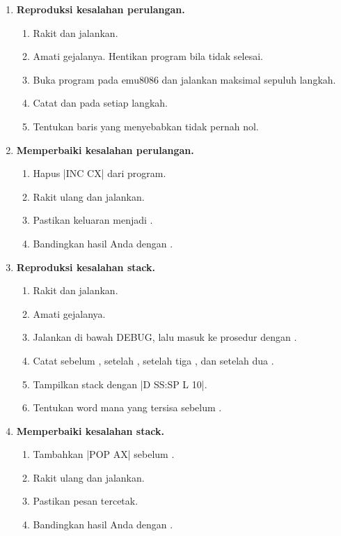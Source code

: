 \begin{enumerate}
    \item \textbf{Reproduksi kesalahan perulangan.}
    \begin{enumerate}
        \item Rakit  dan jalankan.
        \item Amati gejalanya. Hentikan program bila tidak selesai.
        \item Buka program pada emu8086 dan jalankan
               maksimal sepuluh langkah.
        \item Catat  dan  pada setiap langkah.
        \item Tentukan baris yang menyebabkan  tidak pernah
              nol.
    \end{enumerate}

    \item \textbf{Memperbaiki kesalahan perulangan.}
    \begin{enumerate}
        \item Hapus \lstasm|INC CX| dari program.
        \item Rakit ulang dan jalankan.
        \item Pastikan keluaran menjadi .
        \item Bandingkan hasil Anda dengan .
    \end{enumerate}

    \item \textbf{Reproduksi kesalahan stack.}
    \begin{enumerate}
        \item Rakit  dan jalankan.
        \item Amati gejalanya.
        \item Jalankan di bawah DEBUG, lalu masuk ke prosedur
               dengan .
        \item Catat  sebelum , setelah ,
              setelah tiga , dan setelah dua .
        \item Tampilkan stack dengan \lstasm|D SS:SP L 10|.
        \item Tentukan word mana yang tersisa sebelum .
    \end{enumerate}

    \item \textbf{Memperbaiki kesalahan stack.}
    \begin{enumerate}
        \item Tambahkan \lstasm|POP AX| sebelum .
        \item Rakit ulang dan jalankan.
        \item Pastikan pesan  tercetak.
        \item Bandingkan hasil Anda dengan .
    \end{enumerate}


\end{enumerate}
